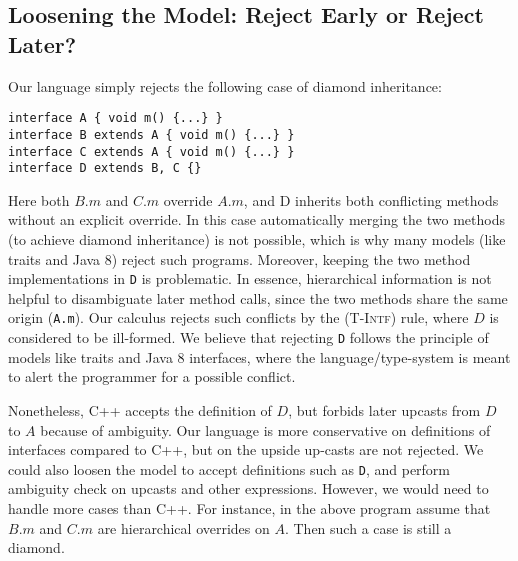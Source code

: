 \subsection{Loosening the Model: Reject Early or Reject Later?}

Our language simply rejects the following case of diamond inheritance:

\vspace{3pt}\begin{lstlisting}
interface A { void m() {...} }
interface B extends A { void m() {...} }
interface C extends A { void m() {...} }
interface D extends B, C {}
\end{lstlisting}\vspace{3pt}
Here both $B.m$ and $C.m$ override $A.m$, and D inherits
both conflicting methods without an explicit override. In this case automatically merging 
the two methods (to achieve diamond inheritance) is not possible, which is why many 
models (like traits and Java 8) reject such programs. Moreover, keeping the two 
method implementations in \lstinline|D| is problematic. 
In essence, hierarchical information is 
not helpful to disambiguate later method calls, since the two methods share 
the same origin (\lstinline|A.m|). 
Our calculus rejects such conflicts by the \textsc{(T-Intf)} rule, where $D$ is considered to be ill-formed. 
We believe that rejecting \lstinline|D| follows the principle of models like traits and Java 8 interfaces, 
where the language/type-system is meant to alert the programmer for a possible conflict.

Nonetheless,
 C++ accepts the definition of $D$, but forbids later upcasts from $D$ to $A$ because of ambiguity. Our language is more conservative on definitions of interfaces compared to C++, but on the upside up-casts are not rejected. We could also loosen the model to accept definitions such as \lstinline|D|, and perform ambiguity check on upcasts and other expressions. However, we would need to handle more cases than C++. For instance, in the above program assume that $B.m$ and $C.m$ are hierarchical overrides on $A$. Then such a case is still a diamond.

\begin{comment}
Another case is about the restriction on hierarchical overrides. In our language model there are two types of methods (though they share the same syntax): original methods and hierarchical overrides. We require that a hierarchical override should only override an original method. Yet from the idea of encapsulation and modularity on programs, we could also allow an override to work on another override, which forms a series of overrides.
\end{comment}

